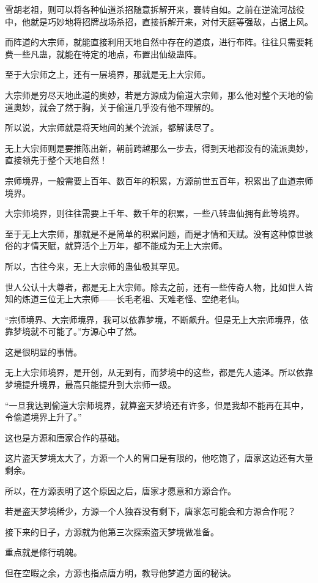 \begin{this_body}
雪胡老祖，则可以将各种仙道杀招随意拆解开来，寰转自如。之前在逆流河战役中，他就是巧妙地将招牌战场杀招，直接拆解开来，对付天庭等强敌，占据上风。

而阵道的大宗师，就能直接利用天地自然中存在的道痕，进行布阵。往往只需要耗费一些凡蛊，就能在特定的地点，布置出仙级蛊阵。

至于大宗师之上，还有一层境界，那就是无上大宗师。

大宗师是穷尽天地此道的奥妙，若是方源成为偷道大宗师，那么他对整个天地的偷道奥妙，就会了然于胸，关于偷道几乎没有他不理解的。

所以说，大宗师就是将天地间的某个流派，都解读尽了。

无上大宗师则是要推陈出新，朝前跨越那么一步去，得到天地都没有的流派奥妙，直接领先于整个天地自然！

宗师境界，一般需要上百年、数百年的积累，方源前世五百年，积累出了血道宗师境界。

大宗师境界，则往往需要上千年、数千年的积累，一些八转蛊仙拥有此等境界。

至于无上大宗师，那就是不是简单的积累问题，而是才情和天赋。没有这种惊世骇俗的才情天赋，就算活个上万年，都不能成为无上大宗师。

所以，古往今来，无上大宗师的蛊仙极其罕见。

世人公认十大尊者，都是无上大宗师。除去之前，还有一些传奇人物，比如世人皆知的炼道三位无上大宗师——长毛老祖、天难老怪、空绝老仙。

“宗师境界、大宗师境界，我可以依靠梦境，不断飙升。但是无上大宗师境界，依靠梦境就不可能了。”方源心中了然。

这是很明显的事情。

无上大宗师境界，是开创，从无到有，而梦境中的这些，都是先人遗泽。所以依靠梦境提升境界，最高只能提升到大宗师一级。

“一旦我达到偷道大宗师境界，就算盗天梦境还有许多，但是我却不能再在其中，令偷道境界上升了。”

这也是方源和唐家合作的基础。

这片盗天梦境太大了，方源一个人的胃口是有限的，他吃饱了，唐家这边还有大量剩余。

所以，在方源表明了这个原因之后，唐家才愿意和方源合作。

若是盗天梦境稀少，方源一个人独吞没有剩下，唐家怎可能会和方源合作呢？

接下来的日子，方源就为他第三次探索盗天梦境做准备。

重点就是修行魂魄。

但在空暇之余，方源也指点唐方明，教导他梦道方面的秘诀。


\end{this_body}

